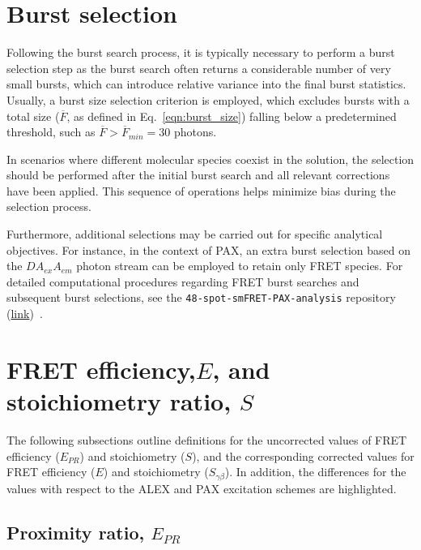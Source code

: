 \section{Burst selection}
\label{sec:burst_selection_apdx}

Following the burst search process, it is typically necessary to perform a burst selection step as the burst search often returns a considerable number of very small bursts, which can introduce relative variance into the final burst statistics.
Usually, a burst size selection criterion is employed, which excludes bursts with a total size ($\overline{F}$, as defined in Eq.~\ref{eqn:burst_size}) falling below a predetermined threshold, such as $\overline{F} > \overline{F}_{min} = 30$ photons.

In scenarios where different molecular species coexist in the solution, the selection should be performed after the initial burst search and all relevant corrections have been applied. 
This sequence of operations helps minimize bias during the selection process.

Furthermore, additional selections may be carried out for specific analytical objectives. 
For instance, in the context of \ac{PAX}, an extra burst selection based on the $DA_{ex}A_{em}$ photon stream can be employed to retain only FRET species. For detailed computational procedures regarding FRET burst searches and subsequent burst selections, see the \texttt{48-spot-smFRET-PAX-analysis} repository (\href{https://github.com/tritemio/48-spot-smFRET-PAX-analysis}{link})~\cite{ingargiola_JCP_2018}.

\section{FRET efficiency,$E$, and stoichiometry ratio, $S$}
\label{sec:ratiometric_E_S_apdx}

The following subsections outline definitions for the uncorrected values of FRET efficiency ($E_{PR}$) and stoichiometry ($S$), and the corresponding corrected values for FRET efficiency ($E$) and stoichiometry ($S_{\gamma\beta}$).
In addition, the differences for the values with respect to the \ac{ALEX} and \ac{PAX} excitation schemes are highlighted.

\subsection{Proximity ratio, $E_{PR}$}
\label{sec:Epr_apdx}

